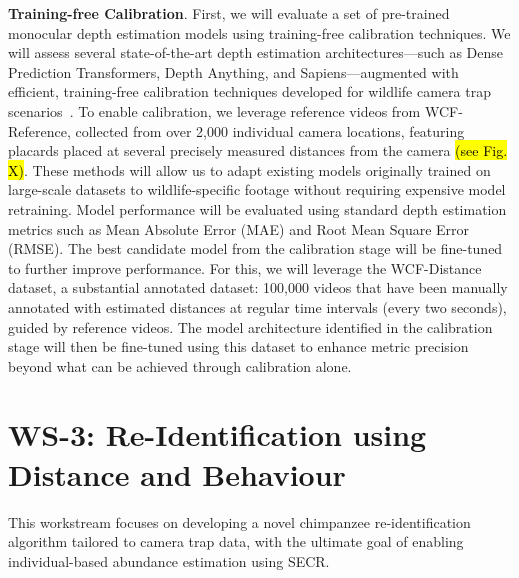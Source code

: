 \textbf{Training-free Calibration}. First, we will evaluate a set of pre-trained monocular depth estimation models using training-free calibration techniques. We will assess several state-of-the-art depth estimation architectures—such as Dense Prediction Transformers, Depth Anything, and Sapiens—augmented with efficient, training-free calibration techniques developed for wildlife camera trap scenarios~\cite{}. To enable calibration, we leverage reference videos from WCF-Reference, collected from over 2,000 individual camera locations, featuring placards placed at several precisely measured distances from the camera \hl{(see Fig. X)}. These methods will allow us to adapt existing models originally trained on large-scale datasets to wildlife-specific footage without requiring expensive model retraining. Model performance will be evaluated using standard depth estimation metrics such as Mean Absolute Error (MAE) and Root Mean Square Error (RMSE). The best candidate model from the calibration stage will be fine-tuned to further improve performance. For this, we will leverage the WCF-Distance dataset, a substantial annotated dataset: 100,000 videos that have been manually annotated with estimated distances at regular time intervals (every two seconds), guided by reference videos. The model architecture identified in the calibration stage will then be fine-tuned using this dataset to enhance metric precision beyond what can be achieved through calibration alone.



\section*{WS-3: Re-Identification using Distance and Behaviour}

This workstream focuses on developing a novel chimpanzee re-identification algorithm tailored to camera trap data, with the ultimate goal of enabling individual-based abundance estimation using SECR.


